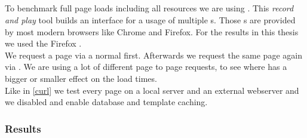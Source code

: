 \subsection{\selenium{}\label{selenium}}

To benchmark full page loads including all resources we are using \selenium{}.
This \emph{record and play} tool builds an interface for a usage of multiple \webdriver{}s.
Those \webdriver{}s are provided by most modern browsers like Chrome and Firefox.
For the results in this thesis we used the Firefox \webdriver{}.
\\
We request a page via a normal \httpRequest{} first.
Afterwards we request the same page again via \lare{}.
We are using a lot of different page to page requests, to see where \lare{} has a bigger or smaller effect on the load times.
\\
Like in \ref{curl} we test every page on a local server and an external webserver and we disabled and enable database and template caching.

\subsubsection{Results}

